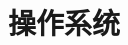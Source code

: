 \documentclass[../../interview-questions.tex]{subfiles}
\begin{document}
\section{操作系统}



\end{document}
